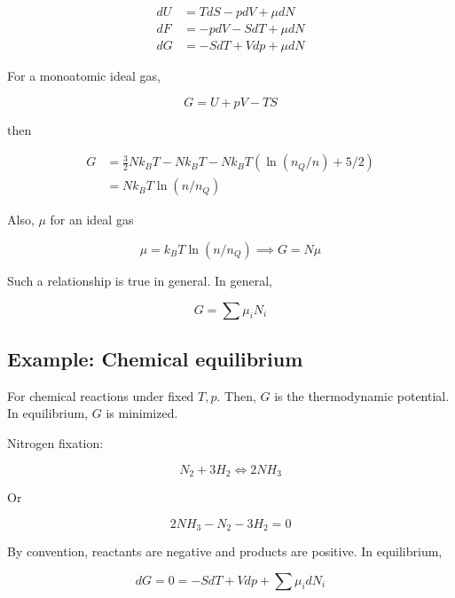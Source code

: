 \documentclass{article}
\newtheorem{one minute paper}[theorem]{One Minute Paper}
\begin{document}
\begin{align}
    dU &= TdS - pdV + \mu dN \\
    dF &= -pdV - SdT + \mu dN \\
    dG &= -S dT + Vdp + \mu dN
\end{align}

For a monoatomic ideal gas, 

\begin{equation}
    G = U + pV - TS
\end{equation}

then 

\begin{align}
    G &= \frac{3}{2}Nk_B T - Nk_B T - Nk_B T\left( \ln(n_Q/n) + 5/2  \right) \\
    &= Nk_B T\ln\left( n/n_Q \right)
\end{align}

Also, $\mu$ for an ideal gas 

\begin{equation}
    \mu = k_B T \ln(n/n_Q) \implies G = N\mu
\end{equation}

Such a relationship is true in general. In general, 

\begin{equation}
    G = \sum \mu_i N_i
\end{equation}

\subsection*{Example: Chemical equilibrium}

For chemical reactions under fixed $T,p$. Then, $G$ is the thermodynamic potential. In equilibrium, $G$ is minimized. 

Nitrogen fixation: 

\begin{equation}
    N_2 + 3H_2 \iff 2 NH_3
\end{equation}

Or 

\begin{equation}
    2NH_3 - N_2 - 3H_2 = 0
\end{equation}

By convention, reactants are negative and products are positive. In equilibrium, 

\begin{equation}
    dG = 0 = -SdT + Vdp + \sum \mu_i dN_i
\end{equation}
\end{document}
